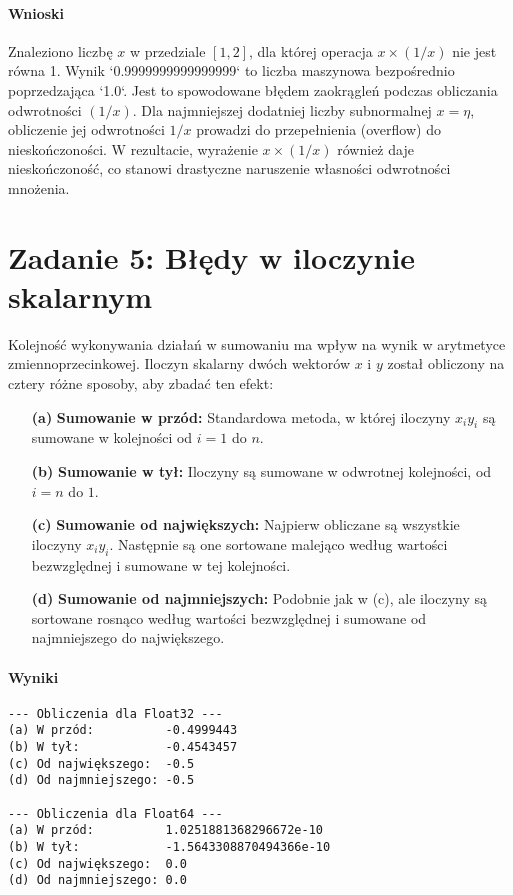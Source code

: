 \documentclass[a4paper,12pt]{article}
\begin{document}
\paragraph{Wnioski}
Znaleziono liczbę $x$ w przedziale $[1, 2]$, dla której operacja $x \times (1/x)$ nie jest równa 1. Wynik `0.9999999999999999` to liczba maszynowa bezpośrednio poprzedzająca `1.0`. Jest to spowodowane błędem zaokrągleń podczas obliczania odwrotności $(1/x)$. Dla najmniejszej dodatniej liczby subnormalnej $x = \eta$, obliczenie jej odwrotności $1/x$ prowadzi do przepełnienia (overflow) do nieskończoności. W rezultacie, wyrażenie $x \times (1/x)$ również daje nieskończoność, co stanowi drastyczne naruszenie własności odwrotności mnożenia.


\section{Zadanie 5: Błędy w iloczynie skalarnym}

Kolejność wykonywania działań w sumowaniu ma wpływ na wynik w arytmetyce zmiennoprzecinkowej. Iloczyn skalarny dwóch wektorów $x$ i $y$ został obliczony na cztery różne sposoby, aby zbadać ten efekt:
\begin{enumerate}
    \item[\textbf{(a)}] \textbf{Sumowanie w przód:} Standardowa metoda, w której iloczyny $x_i y_i$ są sumowane w kolejności od $i=1$ do $n$.
    \item[\textbf{(b)}] \textbf{Sumowanie w tył:} Iloczyny są sumowane w odwrotnej kolejności, od $i=n$ do $1$.
    \item[\textbf{(c)}] \textbf{Sumowanie od największych:} Najpierw obliczane są wszystkie iloczyny $x_i y_i$. Następnie są one sortowane malejąco według wartości bezwzględnej i sumowane w tej kolejności.
    \item[\textbf{(d)}] \textbf{Sumowanie od najmniejszych:} Podobnie jak w (c), ale iloczyny są sortowane rosnąco według wartości bezwzględnej i sumowane od najmniejszego do największego.
\end{enumerate}

\paragraph{Wyniki}
\begin{verbatim}
--- Obliczenia dla Float32 ---
(a) W przód:          -0.4999443
(b) W tył:            -0.4543457
(c) Od największego:  -0.5
(d) Od najmniejszego: -0.5

--- Obliczenia dla Float64 ---
(a) W przód:          1.0251881368296672e-10
(b) W tył:            -1.5643308870494366e-10
(c) Od największego:  0.0
(d) Od najmniejszego: 0.0
\end{verbatim}
\end{document}
